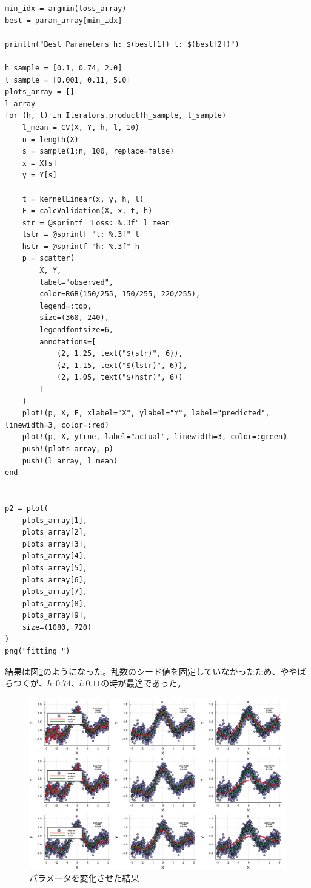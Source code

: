 \documentclass[10pt,a4paper]{ltjsarticle}       %
\begin{document}
\begin{lstlisting}
min_idx = argmin(loss_array)
best = param_array[min_idx]

println("Best Parameters h: $(best[1]) l: $(best[2])")

h_sample = [0.1, 0.74, 2.0]
l_sample = [0.001, 0.11, 5.0]
plots_array = []
l_array
for (h, l) in Iterators.product(h_sample, l_sample)
    l_mean = CV(X, Y, h, l, 10)
    n = length(X)
    s = sample(1:n, 100, replace=false)
    x = X[s]
    y = Y[s]

    t = kernelLinear(x, y, h, l)
    F = calcValidation(X, x, t, h)
    str = @sprintf "Loss: %.3f" l_mean
    lstr = @sprintf "l: %.3f" l
    hstr = @sprintf "h: %.3f" h
    p = scatter(
        X, Y, 
        label="observed", 
        color=RGB(150/255, 150/255, 220/255), 
        legend=:top, 
        size=(360, 240),
        legendfontsize=6,
        annotations=[
            (2, 1.25, text("$(str)", 6)),
            (2, 1.15, text("$(lstr)", 6)),
            (2, 1.05, text("$(hstr)", 6))
        ]
    )
    plot!(p, X, F, xlabel="X", ylabel="Y", label="predicted", linewidth=3, color=:red)
    plot!(p, X, ytrue, label="actual", linewidth=3, color=:green)
    push!(plots_array, p)
    push!(l_array, l_mean)
end


p2 = plot(
    plots_array[1],
    plots_array[2],
    plots_array[3],
    plots_array[4],
    plots_array[5],
    plots_array[6],
    plots_array[7],
    plots_array[8],
    plots_array[9],
    size=(1080, 720)
)
png("fitting_")
\end{lstlisting}
結果は図\ref{fig:cv}のようになった。乱数のシード値を固定していなかったため、ややばらつくが、$h: 0.74$、$l: 0.11$の時が最適であった。
\begin{figure}[h]
  \begin{center}
    \includegraphics[clip, scale=0.4]{fitting.png}
    \caption{パラメータを変化させた結果}
    \label{fig:cv}
  \end{center}
\end{figure}
\end{document}
